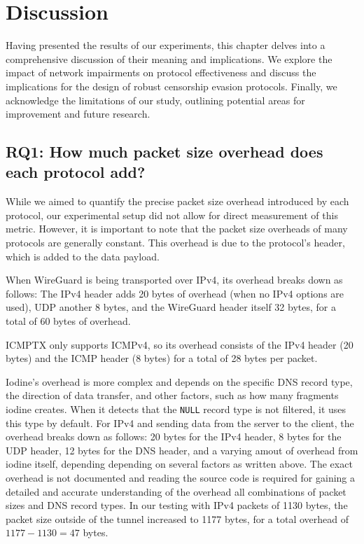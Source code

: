 
\chapter{Discussion}
\label{chap:discussion}
Having presented the results of our experiments, this chapter delves into a comprehensive discussion of their meaning and implications.
We explore the impact of network impairments on protocol effectiveness and discuss the implications for the design of robust censorship evasion protocols.
Finally, we acknowledge the limitations of our study, outlining potential areas for improvement and future research.


\section{RQ1: How much packet size overhead does each protocol add?}
While we aimed to quantify the precise packet size overhead introduced by each protocol, our experimental setup did not allow for direct measurement of this metric.
However, it is important to note that the packet size overheads of many protocols are generally constant.
This overhead is due to the protocol’s header, which is added to the data payload.

When WireGuard is being transported over IPv4, its overhead breaks down as follows: The IPv4 header adds 20 bytes of overhead (when no IPv4 options are used), UDP another 8 bytes, and the WireGuard header itself 32 bytes, for a total of 60 bytes of overhead.

ICMPTX only supports ICMPv4, so its overhead consists of the IPv4 header (20 bytes) and the ICMP header (8 bytes) \cite{RFC0792} for a total of 28 bytes per packet.

Iodine's overhead is more complex and depends on the specific DNS record type, the direction of data transfer, and other factors, such as how many fragments iodine creates.
When it detects that the \texttt{NULL} record type is not filtered, it uses this type by default.
For IPv4 and sending data from the server to the client, the overhead breaks down as follows:
20 bytes for the IPv4 header, 8 bytes for the UDP header, 12 bytes for the DNS header, and a varying amout of overhead from iodine itself, depending depending on several factors as written above.
The exact overhead is not documented and reading the source code is required for gaining a detailed and accurate understanding of the overhead all combinations of packet sizes and DNS record types.
In our testing with IPv4 packets of 1130 bytes, the packet size outside of the tunnel increased to 1177 bytes, for a total overhead of $1177 - 1130 = 47$ bytes.



